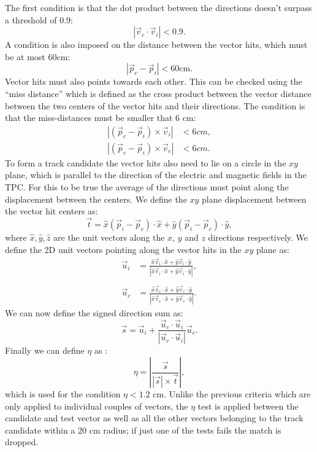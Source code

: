 The first condition is that the dot product between the directions doesn't surpass a threshold of 0.9:
\begin{equation}
    |\Vec{v}_c\cdot\Vec{v}_i|<0.9.
\end{equation}
A condition is also imposed on the distance between the vector hits, which must be at most 60cm:
\begin{equation}
    |\Vec{p}_c-\Vec{p}_i|<60 \text{cm}.
\end{equation}
Vector hits must also points towards each other. This can be checked using the \enquote{miss distance} which is defined as the cross product between the vector distance between the two centers of the vector hits and their directions. The condition is that the miss-distances must be smaller that 6 cm:
\begin{equation}
    \begin{aligned}
    |(\Vec{p}_c-\Vec{p}_i)\times\Vec{v}_i|&<6cm, \\
    |(\Vec{p}_c-\Vec{p}_i)\times\Vec{v}_c|&<6cm. 
    \end{aligned}   
\end{equation} 
To form a track candidate the vector hits also need to lie on a circle in the $xy$ plane, which is parallel to the direction of the electric and magnetic fields in the TPC. For this to be true the average of the directions must point along
the displacement between the centers. We define the $xy$ plane displacement between the vector hit centers as:
\begin{equation}
    \Vec{t}=\hat{x}(\Vec{p}_i-\Vec{p}_c)\cdot\hat{x}+\hat{y}(\Vec{p}_i-\Vec{p}_c)\cdot\hat{y},
\end{equation}
where $\hat{x},\hat{y},\hat{z}$ are the unit vectors along the $x$, $y$ and $z$ directions respectively. We define the 2D unit vectors pointing along the vector hits in the $xy$ plane as:
\begin{equation}
    \begin{aligned}
    \Vec{u}_i&=\frac{\hat{x}\Vec{v}_i\cdot\hat{x}+\hat{y}\Vec{v}_i\cdot\hat{y}}{|\hat{x}\Vec{v}_i\cdot\hat{x}+\hat{y}\Vec{v}_i\cdot\hat{y}|}, \\ \\
    \Vec{u}_c&=\frac{\hat{x}\Vec{v}_c\cdot\hat{x}+\hat{y}\Vec{v}_c\cdot\hat{y}}{|\hat{x}\Vec{v}_c\cdot\hat{x}+\hat{y}\Vec{v}_c\cdot\hat{y}|}.  
    \end{aligned}   
\end{equation} 
We can now define the signed direction sum as:
\begin{equation}
    \Vec{s}=\Vec{u}_i+\frac{\Vec{u}_c\cdot\Vec{u}_i}{|\Vec{u}_c\cdot\Vec{u}_i|}\Vec{u}_c.
\end{equation}
Finally we can define $\eta$ as :
\begin{equation}
    \eta = \left|\frac{\Vec{s}}{|\Vec{s}|\times\Vec{t}}\right|,
\end{equation}
which is used for the condition $\eta<1.2$ cm. Unlike the previous criteria which are only applied to individual couples of vectors, the $\eta$ test is applied between the candidate and test vector as well as all the other vectors belonging to the track candidate within a 20 cm radius; if just one of the tests fails the match is dropped.


